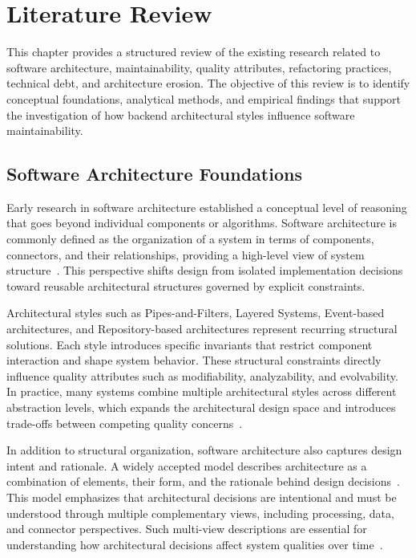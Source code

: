 \chapter{Literature Review}
\label{chap:lr}

This chapter provides a structured review of the existing research related to software architecture, maintainability, quality attributes, refactoring practices, technical debt, and architecture erosion.  
The objective of this review is to identify conceptual foundations, analytical methods, and empirical findings that support the investigation of how backend architectural styles influence software maintainability.

\section{Software Architecture Foundations}

Early research in software architecture established a conceptual level of reasoning that goes beyond individual components or algorithms. Software architecture is commonly defined as the organization of a system in terms of components, connectors, and their relationships, providing a high-level view of system structure~\cite{garlan1993introduction}. This perspective shifts design from isolated implementation decisions toward reusable architectural structures governed by explicit constraints.

Architectural styles such as Pipes-and-Filters, Layered Systems, Event-based architectures, and Repository-based architectures represent recurring structural solutions. Each style introduces specific invariants that restrict component interaction and shape system behavior. These structural constraints directly influence quality attributes such as modifiability, analyzability, and evolvability. In practice, many systems combine multiple architectural styles across different abstraction levels, which expands the architectural design space and introduces trade-offs between competing quality concerns~\cite{garlan1993introduction}.

In addition to structural organization, software architecture also captures design intent and rationale. A widely accepted model describes architecture as a combination of elements, their form, and the rationale behind design decisions~\cite{perry1992foundations}. This model emphasizes that architectural decisions are intentional and must be understood through multiple complementary views, including processing, data, and connector perspectives. Such multi-view descriptions are essential for understanding how architectural decisions affect system qualities over time~\cite{perry1992foundations}.

